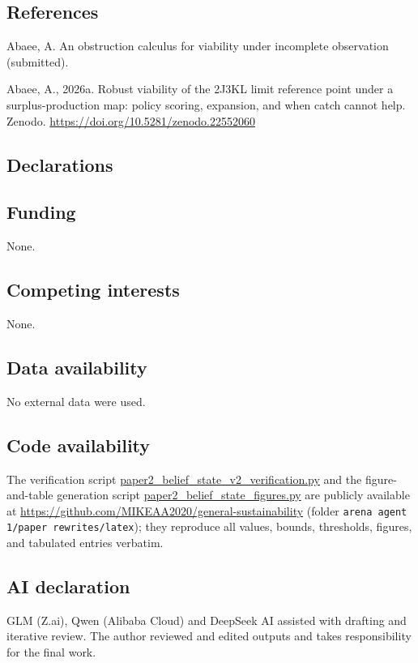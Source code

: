 \documentclass[10pt,twocolumn]{article}
\theoremstyle{plain}
\theoremstyle{definition}
\theoremstyle{remark}
\begin{document}
\subsection*{References}

Abaee, A. An obstruction calculus for viability under incomplete
observation (submitted).

Abaee, A., 2026a. Robust viability of the 2J3KL limit reference point
under a surplus-production map: policy scoring, expansion, and when
catch cannot help. Zenodo.
\url{https://doi.org/10.5281/zenodo.22552060}

\subsection*{Declarations}

\subsection*{Funding}
None.

\subsection*{Competing interests}
None.

\subsection*{Data availability}
No external data were used.

\subsection*{Code availability}
The verification script \url{paper2_belief_state_v2_verification.py} and
the figure-and-table generation script
\url{paper2_belief_state_figures.py} are publicly available at
\url{https://github.com/MIKEAA2020/general-sustainability} (folder
\texttt{arena agent 1/paper rewrites/latex}); they reproduce all values,
bounds, thresholds, figures, and tabulated entries verbatim.

\subsection*{AI declaration}
GLM (Z.ai), Qwen (Alibaba Cloud) and DeepSeek AI assisted with drafting
and iterative review. The author reviewed and edited outputs and takes
responsibility for the final work.
\end{document}
